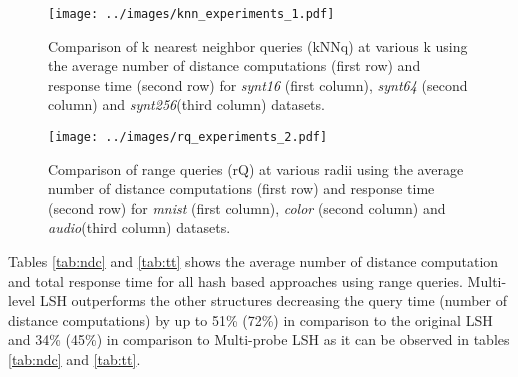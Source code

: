 

\begin{figure*}[!t]
\centering
\texttt{[image: ../images/knn\_experiments\_1.pdf]}
\caption{Comparison of k nearest neighbor queries (kNNq) at various k using the average number of distance computations (first row) and response time (second row) for \textit{synt16} (first column), \textit{synt64} (second column) and \textit{synt256}(third column) datasets.}
\label{fig:knn_1}
\end{figure*}
\begin{figure*}[!t]
\centering
\texttt{[image: ../images/rq\_experiments\_2.pdf]}
\caption{Comparison of range queries (rQ) at various radii using the average number of distance computations (first row) and response time (second row) for \textit{mnist} (first column), \textit{color} (second column) and \textit{audio}(third column) datasets.
}
\label{fig:rq_2}
\end{figure*}
Tables \ref{tab:ndc} and \ref{tab:tt} shows the average number of distance computation and total response time for all hash based approaches using range queries.  Multi-level LSH outperforms the other structures decreasing the query time (number of distance computations) by up to 51\%  (72\%)  in comparison to the original LSH and 34\% (45\%) in comparison to Multi-probe LSH  as it can be observed in tables \ref{tab:ndc} and \ref{tab:tt}.

